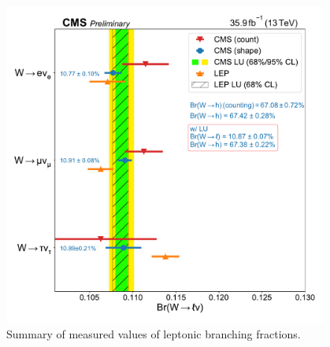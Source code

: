 \begin{table}[htb!]
    \centering
    \renewcommand{\arraystretch}{1.5}
    \caption{Correlation matrix of leptonic branching fractions.}
    \label{tab:results_corr}
\end{table}




            
\begin{figure}[htb!]
    \begin{center}
    \includegraphics[width=0.95\textwidth]{chapters/Analysis/sectionResult/figures/unblinded_summary_plot.pdf}
    \caption{Summary of measured values of leptonic branching fractions.}
    \label{fig:wbr_result_1D}
    \end{center}
\end{figure}

